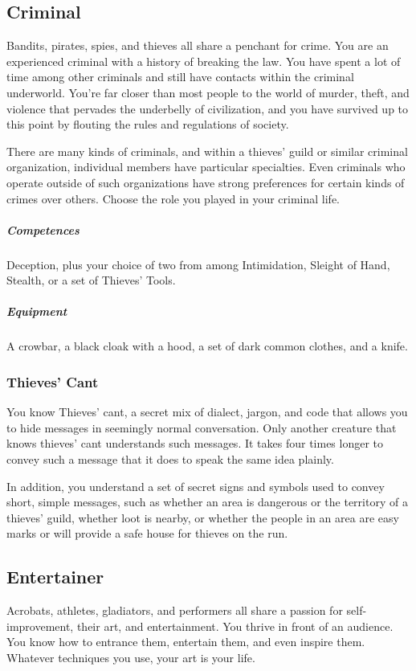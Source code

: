 \newpage

\subsection*{Criminal} \label{ssec::criminal}
    Bandits, pirates, spies, and thieves all share a penchant for crime.
    You are an experienced criminal with a history of breaking the law.
    You have spent a lot of time among other criminals and still have contacts within the criminal underworld.
    You're far closer than most people to the world of murder, theft, and violence that pervades the underbelly of civilization, and you have survived up to this point by flouting the rules and regulations of society.

    There are many kinds of criminals, and within a thieves' guild or similar criminal organization, individual members have particular specialties.
    Even criminals who operate outside of such organizations have strong preferences for certain kinds of crimes over others.
    Choose the role you played in your criminal life.

    \subparagraph{Competences} Deception, plus your choice of two from among Intimidation, Sleight of Hand, Stealth, or a set of Thieves' Tools.

    \subparagraph{Equipment} A crowbar, a black cloak with a hood, a set of dark common clothes, and a knife.

    \subsubsection{Thieves' Cant} \label{feat::thievescant}
        You know Thieves' cant, a secret mix of dialect, jargon, and code that allows you to hide messages in seemingly normal conversation.
        Only another creature that knows thieves' cant understands such messages.
        It takes four times longer to convey such a message that it does to speak the same idea plainly.

        In addition, you understand a set of secret signs and symbols used to convey short, simple messages, such as whether an area is dangerous or the territory of a thieves' guild, whether loot is nearby, or whether the people in an area are easy marks or will provide a safe house for thieves on the run.

\subsection*{Entertainer} \label{ssec::entertainer}
    Acrobats, athletes, gladiators, and performers all share a passion for self-improvement, their art, and entertainment. %
    You thrive in front of an audience.
    You know how to entrance them, entertain them, and even inspire them.
    Whatever techniques you use, your art is your life.

